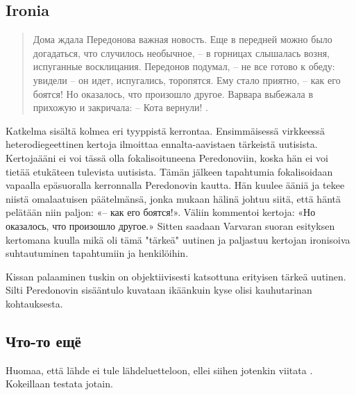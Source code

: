 \documentclass[12pt,a4paper]{article}
\begin{document}
\subsection{Ironia}

\begin{quote}
Дома ждала Передонова важная новость. Еще в передней можно
было догадаться, что случилось необычное, – в горницах слышалась 
возня, испуганные восклицания. Передонов подумал, – не все
готово к обеду: увидели – он идет, испугались, торопятся. Ему стало
приятно, – как его боятся! Но оказалось, что произошло другое. 
Варвара выбежала в прихожую и закричала: 
– Кота вернули!
\parencite[200]{ref:sologub2001}.
\end{quote}

Katkelma sisältä kolmea eri tyyppistä kerrontaa. Ensimmäisessä virkkeessä
heterodiegeettinen kertoja ilmoittaa ennalta-aavistaen tärkeistä uutisista.
Kertojaääni ei voi tässä olla fokalisoituneena Peredonoviin, koska
hän ei voi tietää etukäteen tulevista uutisista. Tämän jälkeen tapahtumia
fokalisoidaan vapaalla epäsuoralla kerronnalla Peredonovin kautta. Hän
kuulee ääniä ja tekee niistä omalaatuisen päätelmänsä, jonka mukaan hälinä
johtuu siitä, että häntä pelätään niin paljon: «– как его боятся!». Väliin 
kommentoi kertoja: «Но оказалось, что произошло другое.» Sitten saadaan
Varvaran suoran esityksen kertomana kuulla mikä oli tämä "tärkeä" uutinen ja
paljastuu kertojan ironisoiva suhtautuminen tapahtumiin ja henkilöihin.

Kissan palaaminen tuskin on objektiivisesti katsottuna erityisen tärkeä uutinen.
Silti Peredonovin sisääntulo kuvataan ikäänkuin kyse olisi kauhutarinan 
kohtauksesta.

\subsection{Что-то ещё}

Huomaa, että lähde ei tule lähdeluetteloon, ellei siihen jotenkin
viitata \parencite[55]{artjunova1983}. Kokeillaan testata jotain.


\printbibliography[heading=bibintoc,title={Список использоваемой литературы}]
\end{document}
